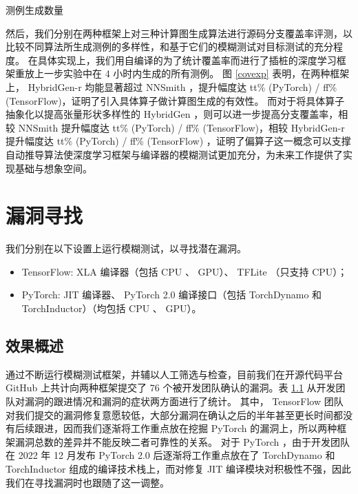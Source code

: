 \begin{table}[]
\label{tab:num_tests}
\centering
\caption{测例生成数量}
\end{table}

然后，我们分别在两种框架上对三种计算图生成算法进行源码分支覆盖率评测，以比较不同算法所生成测例的多样性，和基于它们的模糊测试对目标测试的充分程度。
在具体实现上，我们用自编译的为了统计覆盖率而进行了插桩的深度学习框架重放上一步实验中在 4 小时内生成的所有测例。
图 \ref{covexp} 表明，在两种框架上， HybridGen-r 均能显著超过 NNSmith ，提升幅度达 tt\% (PyTorch) / ff\% (TensorFlow)，证明了引入具体算子做计算图生成的有效性。
而对于将具体算子抽象化以提高张量形状多样性的 HybridGen ，则可以进一步提高分支覆盖率，相较 NNSmith 提升幅度达 tt\% (PyTorch) / ff\% (TensorFlow)，相较 HybridGen-r 提升幅度达 tt\% (PyTorch) / ff\% (TensorFlow) ，证明了偏算子这一概念可以支撑自动推导算法使深度学习框架与编译器的模糊测试更加充分，为未来工作提供了实现基础与想象空间。


\section{漏洞寻找}

我们分别在以下设置上运行模糊测试，以寻找潜在漏洞。

\begin{itemize}
    \item TensorFlow: XLA 编译器（包括 CPU 、 GPU）、 TFLite （只支持 CPU）；
    \item PyTorch: JIT 编译器、 PyTorch 2.0 编译接口（包括 TorchDynamo 和 TorchInductor）（均包括 CPU 、 GPU）。
\end{itemize}

\subsection{效果概述}

通过不断运行模糊测试框架，并辅以人工筛选与检查，目前我们在开源代码平台 GitHub 上共计向两种框架提交了 76 个被开发团队确认的漏洞。表 \ref{} 从开发团队对漏洞的跟进情况和漏洞的症状两方面进行了统计。
其中， TensorFlow 团队对我们提交的漏洞修复意愿较低，大部分漏洞在确认之后的半年甚至更长时间都没有后续跟进，因而我们逐渐将工作重点放在挖掘 PyTorch 的漏洞上，所以两种框架漏洞总数的差异并不能反映二者可靠性的关系。
对于 PyTorch ，由于开发团队在 2022 年 12 月发布 PyTorch 2.0 后逐渐将工作重点放在了 TorchDynamo 和 TorchInductor 组成的编译技术栈上，而对修复 JIT 编译模块对积极性不强，因此我们在寻找漏洞时也跟随了这一调整。

